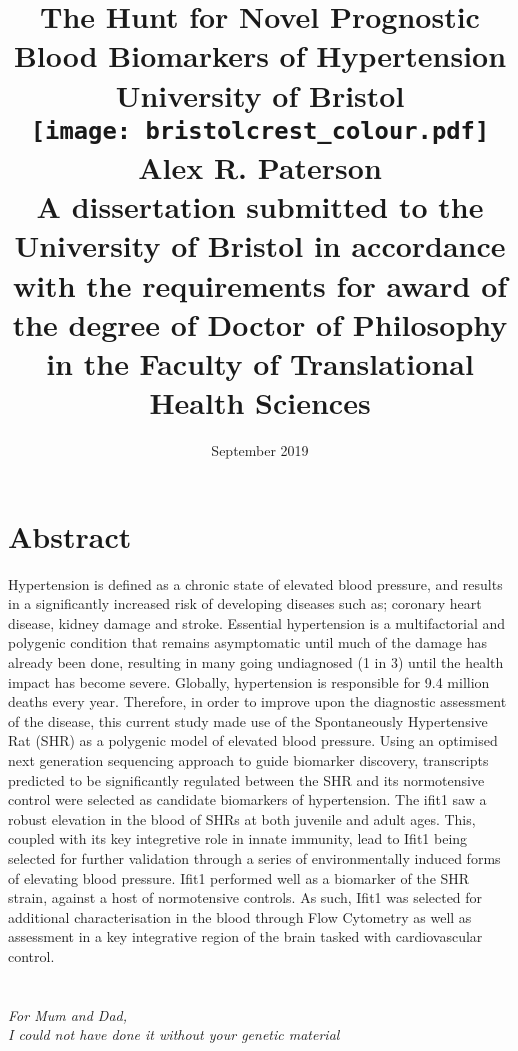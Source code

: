 \documentclass[12pt]{report}
\title{
	{\Huge The Hunt for Novel Prognostic Blood Biomarkers of Hypertension}\\
	{\vspace{7mm}}
	{\large University of Bristol}\\
	{\vspace{5mm}}
	{\texttt{[image: bristolcrest\_colour.pdf]} \\
	{\vspace{5mm}}
	{\large \textbf{Alex R. Paterson}} \\
	{\vspace{5mm}}
	{\small A dissertation submitted to the University of Bristol in accordance with the requirements for award of the degree of Doctor of Philosophy in the Faculty of Translational Health Sciences}} \\
}
\date{September 2019}
\begin{document}
%
\maketitle
%
\chapter*{Abstract}
\singlespacing
Hypertension is defined as a chronic state of elevated blood pressure, and results in a significantly increased risk of developing diseases such as; coronary heart disease, kidney damage and stroke. Essential hypertension is a multifactorial and polygenic condition that remains asymptomatic until much of the damage has already been done, resulting in many going undiagnosed (1 in 3) until the health impact has become severe. Globally, hypertension is responsible for 9.4 million deaths every year. Therefore, in order to improve upon the diagnostic assessment of the disease, this current study made use of the Spontaneously Hypertensive Rat (SHR) as a polygenic model of elevated blood pressure. Using an optimised next generation sequencing approach to guide biomarker discovery, transcripts predicted to be significantly regulated between the SHR and its normotensive control were selected as candidate biomarkers of hypertension. The \acrfull{ifit1} saw a robust elevation in the blood of SHRs at both juvenile and adult ages. This, coupled with its key integretive role in innate immunity, lead to Ifit1 being selected for further validation through a series of environmentally induced forms of elevating blood pressure. Ifit1 performed well as a biomarker of the SHR strain, against a host of normotensive controls. As such, Ifit1 was selected for additional characterisation in the blood through Flow Cytometry as well as assessment in a key integrative region of the brain tasked with cardiovascular control.

\newpage
\singlespacing
\chapter*{}
\begin{center}
\textit{For Mum and Dad,} \\
\vspace{5mm}
\textit{I could not have done it without your genetic material}
\end{center}
%
\end{document}

